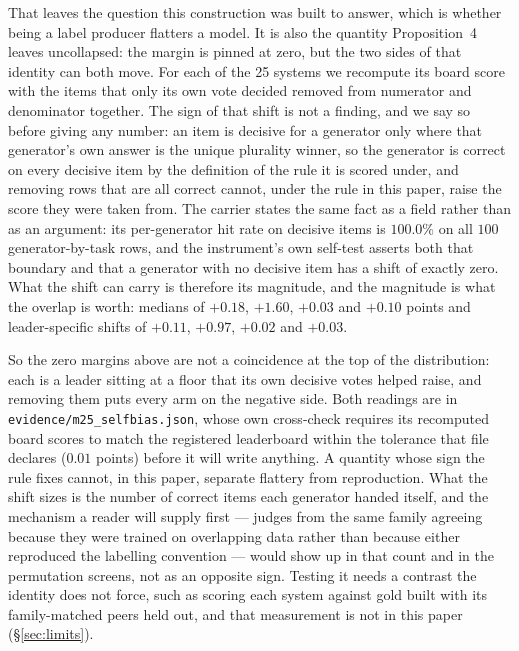 \documentclass{article}
\newcommand{\ids}[1]{\texttt{\small #1}} %
\begin{document}
That leaves the question this construction was built to answer, which is whether being a label producer flatters
a model. It is also the quantity Proposition~4 leaves uncollapsed: the margin is pinned at zero, but the two
sides of that identity can both move. For each of the 25 systems we recompute its board score
with the items that only its own vote decided removed from numerator and denominator together. The sign of that
shift is not a finding, and we say so before giving any number: an item is decisive for a generator only where
that generator's own answer is the unique plurality winner, so the generator is correct on every decisive item
by the definition of the rule it is scored under, and removing rows that are all correct cannot, under the rule in this paper, raise the score they were taken from. The carrier states the same fact as a field rather than as an argument: its per-generator
hit rate on decisive items is $100.0\%$ on all $100$ generator-by-task rows, and the instrument's own self-test
asserts both that boundary and that a generator with no decisive item has a shift of exactly zero. What the
shift can carry is therefore its magnitude, and the magnitude is what the overlap is worth:
medians of $+0.18$, $+1.60$, $+0.03$ and $+0.10$
points and leader-specific shifts of $+0.11$, $+0.97$, $+0.02$ and $+0.03$. 

So the zero margins above are not
a coincidence at the top of the distribution: each is a leader sitting at a floor that its own decisive votes
helped raise, and removing them puts every arm on the negative side. Both readings are in
\ids{evidence/m25\_selfbias.json}, whose own cross-check requires its recomputed board scores to match the
registered leaderboard within the tolerance that file declares ($0.01$ points) before it will write anything.
A quantity whose sign the rule fixes cannot, in this paper, separate flattery from reproduction. What the shift sizes
is the number of correct items each generator handed itself, and the mechanism a reader will supply first ---
judges from the same family agreeing because they were trained on overlapping data rather than because either
reproduced the labelling convention --- would show up in that count and in the permutation screens, not as an
opposite sign. Testing it needs a contrast the identity does not force, such as scoring each system against gold
built with its family-matched peers held out, and that measurement is not in this paper
(\S\ref{sec:limits}).
\end{document}
